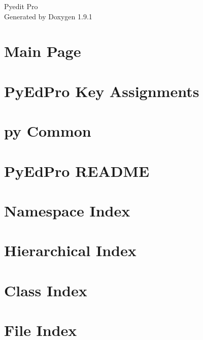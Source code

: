 \let\mypdfximage\pdfximage\def\pdfximage{\immediate\mypdfximage}\documentclass[twoside]{book}
\newcommand{\+}{\discretionary{\mbox{\scriptsize$\hookleftarrow$}}{}{}}
\newcommand{\clearemptydoublepage}{%
  \newpage{\pagestyle{empty}\cleardoublepage}%
}
\begin{document}
\raggedbottom

\hypersetup{pageanchor=false,
             bookmarksnumbered=true,
             pdfencoding=unicode
            }
\begin{titlepage}
\vspace*{7cm}
\begin{center}%
{\Large Pyedit Pro }\\
\vspace*{1cm}
{\large Generated by Doxygen 1.9.1}\\
\end{center}
\end{titlepage}
\clearemptydoublepage
{}
\tableofcontents
\clearemptydoublepage
{}
\hypersetup{pageanchor=true}

\chapter{Main Page}
\label{index}\hypertarget{index}{}
\chapter{Py\+Ed\+Pro Key Assignments}
\label{md_pyedpro_KEYMAP}

\chapter{py Common}
\label{md_pyedpro_pycommon_README}

\chapter{Py\+Ed\+Pro README}
\label{md_README}

\chapter{Namespace Index}

\chapter{Hierarchical Index}

\chapter{Class Index}

\chapter{File Index}

\end{document}
